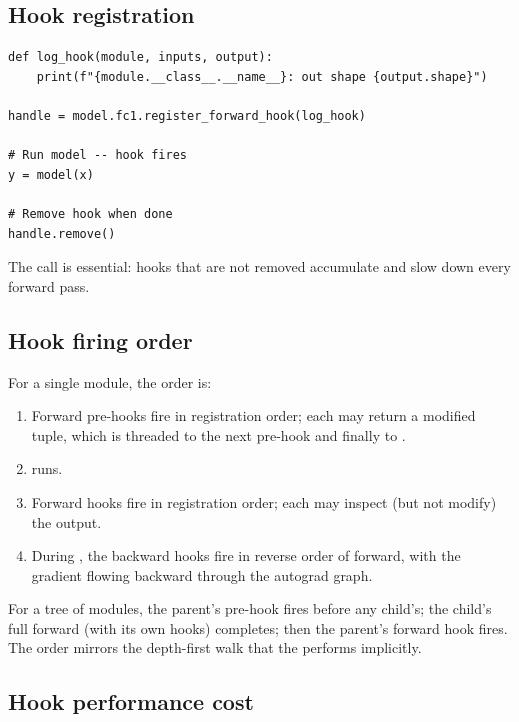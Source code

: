 \subsection{Hook registration}
\label{ssec:module_system:hook_registration}

\begin{lstlisting}[style=lucid,language=LucidPython]
def log_hook(module, inputs, output):
    print(f"{module.__class__.__name__}: out shape {output.shape}")

handle = model.fc1.register_forward_hook(log_hook)

# Run model -- hook fires
y = model(x)

# Remove hook when done
handle.remove()
\end{lstlisting}

The  call is essential: hooks that are not
removed accumulate and slow down every forward pass.

\subsection{Hook firing order}
\label{ssec:module_system:hook_order}

For a single module, the order is:

\begin{enumerate}
  \item Forward pre-hooks fire in registration order;
    each may return a modified  tuple, which is
    threaded to the next pre-hook and finally to
    .
  \item {} runs.
  \item Forward hooks fire in registration order;
    each may inspect (but not modify) the output.
  \item During , the backward hooks fire
    in reverse order of forward, with the gradient flowing
    backward through the autograd graph.
\end{enumerate}

For a tree of modules, the parent's pre-hook fires before any
child's; the child's full forward (with its own hooks)
completes; then the parent's forward hook fires. The order
mirrors the depth-first walk that the
 performs implicitly.

\subsection{Hook performance cost}
\label{ssec:module_system:hook_perf}

